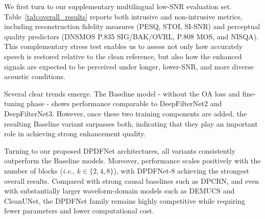 \documentclass[final,5p,times,authoryear]{elsarticle}
\begin{document}



We first turn to our supplementary multilingual low-SNR evaluation set. Table~\ref{tab:overall_results} reports both intrusive and non-intrusive metrics, including reconstruction fidelity measures (PESQ, STOI, SI-SNR) and perceptual quality predictors (DNSMOS P.835 SIG/BAK/OVRL, P.808 MOS, and NISQA). This complementary stress test enables us to assess not only how accurately speech is restored relative to the clean reference, but also how the enhanced signals are expected to be perceived under longer, lower-SNR, and more diverse acoustic conditions.

Several clear trends emerge. The Baseline model - without the OA loss and fine-tuning phase - shows performance comparable to DeepFilterNet2 and DeepFilterNet3. However, once these two training components are added, the resulting Baseline variant surpasses both, indicating that they play an important role in achieving strong enhancement quality.

Turning to our proposed DPDFNet architectures, all variants consistently outperform the Baseline models. Moreover, performance scales positively with the number of blocks (\textit{i.e.}, $k \in \{2,4,8\}$), with DPDFNet-8 achieving the strongest overall results. Compared with strong causal baselines such as DPCRN, and even with substantially larger waveform-domain models such as DEMUCS and CleanUNet, the DPDFNet family remains highly competitive while requiring fewer parameters and lower computational cost.
\end{document}
